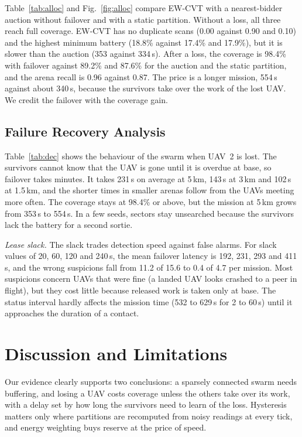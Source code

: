 \documentclass[conference]{IEEEtran}
\begin{document}
Table~\ref{tab:alloc} and Fig.~\ref{fig:alloc} compare EW-CVT with a nearest-bidder auction without failover and with a static partition. Without a loss, all three reach full coverage. EW-CVT has no duplicate scans (0.00 against 0.90 and 0.10) and the highest minimum battery (18.8\% against 17.4\% and 17.9\%), but it is slower than the auction (353 against 334\,s). After a loss, the coverage is 98.4\% with failover against 89.2\% and 87.6\% for the auction and the static partition, and the arena recall is 0.96 against 0.87. The price is a longer mission, 554\,s against about 340\,s, because the survivors take over the work of the lost UAV. We credit the failover with the coverage gain.


\begin{table}[!t]
\caption{Recovery after the loss of UAV~2. Failover: time to the first claim of its sectors.}
\label{tab:dec}
\centering\footnotesize
\setlength{\tabcolsep}{3pt}

\end{table}

\subsection{Failure Recovery Analysis}
Table~\ref{tab:dec} shows the behaviour of the swarm when UAV~2 is lost. The survivors cannot know that the UAV is gone until it is overdue at base, so failover takes minutes. It takes 231\,s on average at 5\,km, 143\,s at 3\,km and 102\,s at 1.5\,km, and the shorter times in smaller arenas follow from the UAVs meeting more often. The coverage stays at 98.4\% or above, but the mission at 5\,km grows from 353\,s to 554\,s. In a few seeds, sectors stay unsearched because the survivors lack the battery for a second sortie.



\emph{Lease slack.} The slack trades detection speed against false alarms. For slack values of 20, 60, 120 and 240\,s, the mean failover latency is 192, 231, 293 and 411\,s, and the wrong suspicions fall from 11.2 of 15.6 to 0.4 of 4.7 per mission. Most suspicions concern UAVs that were fine (a landed UAV looks crashed to a peer in flight), but they cost little because released work is taken only at base. The status interval hardly affects the mission time (532 to 629\,s for 2 to 60\,s) until it approaches the duration of a contact.

\section{Discussion and Limitations}\label{sec:disc}
Our evidence clearly supports two conclusions: a sparsely connected swarm needs buffering, and losing a UAV costs coverage unless the others take over its work, with a delay set by how long the survivors need to learn of the loss. Hysteresis matters only where partitions are recomputed from noisy readings at every tick, and energy weighting buys reserve at the price of speed.
\end{document}
